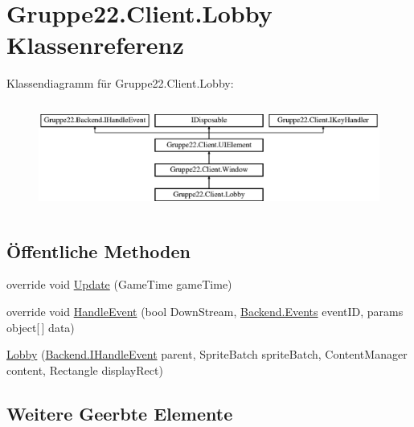 \hypertarget{class_gruppe22_1_1_client_1_1_lobby}{\section{Gruppe22.\-Client.\-Lobby Klassenreferenz}
\label{class_gruppe22_1_1_client_1_1_lobby}
}
Klassendiagramm für Gruppe22.\-Client.\-Lobby\-:\begin{figure}[H]
\begin{center}
\leavevmode
\includegraphics[height=3.589744cm]{class_gruppe22_1_1_client_1_1_lobby}
\end{center}
\end{figure}
\subsection*{Öffentliche Methoden}
\begin{DoxyCompactItemize}
\item 
override void \hyperlink{class_gruppe22_1_1_client_1_1_lobby_ae8c225cc62637fcb8edf68005286fed7}{Update} (Game\-Time game\-Time)
\item 
override void \hyperlink{class_gruppe22_1_1_client_1_1_lobby_a6e3f6336d5da9e230ecf852763c5d605}{Handle\-Event} (bool Down\-Stream, \hyperlink{namespace_gruppe22_1_1_backend_ab56df91bb0bdafa1ea978e552209ce73}{Backend.\-Events} event\-I\-D, params object\mbox{[}$\,$\mbox{]} data)
\item 
\hyperlink{class_gruppe22_1_1_client_1_1_lobby_a6d04a3dc119f01f1a6813a2826c235ad}{Lobby} (\hyperlink{interface_gruppe22_1_1_backend_1_1_i_handle_event}{Backend.\-I\-Handle\-Event} parent, Sprite\-Batch sprite\-Batch, Content\-Manager content, Rectangle display\-Rect)
\end{DoxyCompactItemize}
\subsection*{Weitere Geerbte Elemente}



